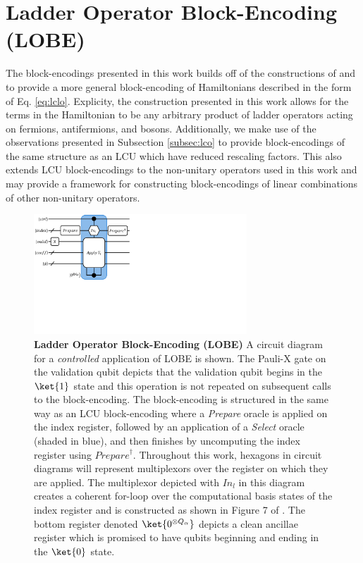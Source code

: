 \section{Ladder Operator Block-Encoding (LOBE)}
\label{sec:lobe}

The block-encodings presented in this work builds off of the constructions of \cite{camps2024explicit} and \cite{liu2024efficient} to provide a more general block-encoding of Hamiltonians described in the form of Eq. \ref{eq:lclo}.
Explicity, the construction presented in this work allows for the terms in the Hamiltonian to be any arbitrary product of ladder operators acting on fermions, antifermions, and bosons.
Additionally, we make use of the observations presented in Subsection \ref{subsec:lco} to provide block-encodings of the same structure as an LCU which have reduced rescaling factors.
This also extends LCU block-encodings to the non-unitary operators used in this work and may provide a framework for constructing block-encodings of linear combinations of other non-unitary operators.

\begin{figure}
    \centering
    \includegraphics[width=8cm]{figures/lobe.pdf}
    \caption{
        \textbf{Ladder Operator Block-Encoding (LOBE)}
        A circuit diagram for a \textit{controlled} application of LOBE is shown. 
        The Pauli-X gate on the validation qubit depicts that the validation qubit begins in the $\ket{1}$ state and this operation is not repeated on subsequent calls to the block-encoding.
        The block-encoding is structured in the same way as an LCU block-encoding where a \textit{Prepare} oracle is applied on the index register, followed by an application of a \textit{Select} oracle (shaded in blue), and then finishes by uncomputing the index register using $\textit{Prepare}^\dagger$.
        Throughout this work, hexagons in circuit diagrams will represent multiplexors over the register on which they are applied.
        The multiplexor depicted with $\textit{In}_l$ in this diagram creates a coherent for-loop over the computational basis states of the index register and is constructed as shown in Figure 7 of \cite{babbush2018encoding}.
        The bottom register denoted $\ket{0^{\otimes Q_\alpha}}$ depicts a clean ancillae register which is promised to have qubits beginning and ending in the $\ket{0}$ state.
    }
    \label{fig:lobe}
\end{figure}

